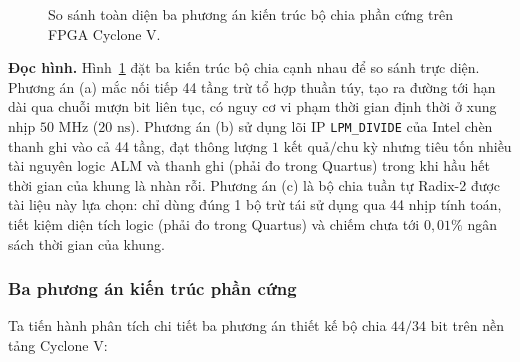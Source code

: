 \begin{figure}[H]
\centering

\caption{So sánh toàn diện ba phương án kiến trúc bộ chia phần cứng trên FPGA Cyclone V.}
\label{fig:ch09_divider_arch}
\end{figure}

\textbf{Đọc hình.} Hình~\ref{fig:ch09_divider_arch} đặt ba kiến trúc bộ chia cạnh nhau để so sánh trực diện. Phương án (a) mắc nối tiếp 44 tầng trừ tổ hợp thuần túy, tạo ra đường tới hạn dài qua chuỗi mượn bit liên tục, có nguy cơ vi phạm thời gian định thời ở xung nhịp $50\text{ MHz}$ ($20\text{ ns}$). Phương án (b) sử dụng lõi IP \texttt{LPM\_DIVIDE} của Intel chèn thanh ghi vào cả 44 tầng, đạt thông lượng $1\text{ kết quả/chu kỳ}$ nhưng tiêu tốn nhiều tài nguyên logic ALM và thanh ghi (phải đo trong Quartus) trong khi hầu hết thời gian của khung là nhàn rỗi. Phương án (c) là bộ chia tuần tự Radix-2 được tài liệu này lựa chọn: chỉ dùng đúng 1 bộ trừ tái sử dụng qua 44 nhịp tính toán, tiết kiệm diện tích logic (phải đo trong Quartus) và chiếm chưa tới $0{,}01\%$ ngân sách thời gian của khung.

\subsubsection*{Ba phương án kiến trúc phần cứng}
Ta tiến hành phân tích chi tiết ba phương án thiết kế bộ chia $44/34\text{ bit}$ trên nền tảng Cyclone V:

